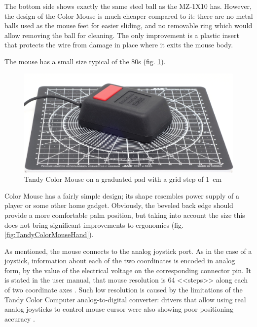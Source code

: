 \documentclass[11pt, a4paper]{article}
\begin{document}
The bottom side shows exactly the same steel ball as the MZ-1X10 has. However, the design of the Color Mouse is much cheaper compared to it: there are no metal balls used as the mouse feet for easier sliding, and no removable ring which would allow removing the ball for cleaning. The only improvement is a plastic insert that protects the wire from damage in place where it exits the mouse body.

The mouse has a small size typical of the 80s (fig. \ref{fig:TandyColorMouseSize}).

\begin{figure}[h]
    \centering
    \includegraphics[scale=0.49]{1984_tandy_trs80_color_mouse/size_30.jpg}
    \caption{Tandy Color Mouse on a graduated pad with a grid step of 1~cm}
    \label{fig:TandyColorMouseSize}
\end{figure}

Color Mouse has a fairly simple design; its shape resembles power supply of a player or some other home gadget. Obviously, the beveled back edge should provide a more comfortable palm position, but taking into account the size this does not bring significant improvements to ergonomics (fig. \ref{fig:TandyColorMouseHand}).

As mentioned, the mouse connects to the analog joystick port. As in the case of a joystick, information about each of the two coordinates is encoded in analog form, by the value of the electrical voltage on the corresponding connector pin. It is stated in the user manual, that mouse resolution is 64 <<steps>> along each of two coordinate axes \cite{manual}. Such low resolution is caused by the limitations of the Tandy Color Computer analog-to-digital converter: drivers that allow using real analog joysticks to control mouse cursor were also showing poor positioning accuracy \cite{hierophant}.
\end{document}
